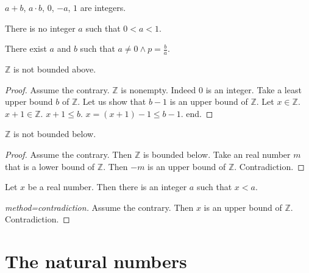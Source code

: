 \documentclass{article}
\begin{document}
\begin{forthel}

\begin{axiom}
$a + b$, $a \cdot b$, $0$, $-a$, $1$ are integers.
\end{axiom}

\begin{axiom}
There is no integer $a$ such that $0 < a < 1$.
\end{axiom}

\begin{axiom}
There exist $a$ and $b$ such that
$a \neq 0 \wedge p = \frac{b}{a}$.
\end{axiom}

\begin{theorem}[id=Archimedes_1,title=Archimedes 1]
$\mathbb{Z}$ is not bounded above.
\end{theorem}
\begin{proof}
Assume the contrary.
$\mathbb{Z}$ is nonempty. Indeed $0$ is an integer.
Take a least upper bound
$b$ of $\mathbb{Z}$.
Let us show that $b - 1$ is an upper bound of $\mathbb{Z}$.
Let $x \in \mathbb{Z}$. $x + 1 \in \mathbb{Z}$.
$x + 1 \leq b$.
$x = (x + 1) - 1 \leq b - 1$.
end.
\end{proof}

\begin{theorem}
$\mathbb{Z}$ is not bounded below.
\end{theorem}
\begin{proof}
Assume the contrary.
Then $\mathbb{Z}$ is bounded below.
Take an real number $m$ that is a lower bound of $\mathbb{Z}$.
Then $-m$ is an upper bound of $\mathbb{Z}$.
Contradiction.
\end{proof}

\begin{theorem}[id=Archimedes_2,title=Archimedes 2]
Let $x$ be a real number.
Then there is an integer $a$
such that $x < a$.
\end{theorem}
\begin{proof}[method=contradiction]
Assume the contrary.
Then $x$ is an upper bound of $\mathbb{Z}$.
Contradiction.
\end{proof}

\end{forthel}


\section{The natural numbers}
\end{document}
